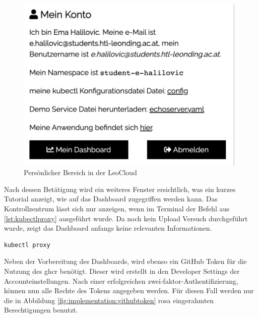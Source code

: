 \begin{figure}
    \centering
    \includegraphics[scale=0.5]{pics/leowikimeinkonto.png}
    \caption{Persönlicher Bereich in der LeoCloud}
    \label{fig:implementation:meinkonto}
\end{figure}

Nach dessen Betätigung wird ein weiteres Fenster ersichtlich, was ein kurzes Tutorial anzeigt, wie auf das Dashboard zugegriffen werden kann. 
Das Kontrollzentrum lässt sich nur anzeigen, wenn im Terminal der Befehl aus \ref{lst:kubectlproxy} ausgeführt wurde. 
Da noch kein Upload Versuch durchgeführt wurde, zeigt das Dashboard anfangs keine relevanten Informationen.

\begin{lstlisting}[label=lst:kubectlproxy, language=bash, caption=Ausführung des Proxys für Kubernetes]
kubectl proxy
\end{lstlisting}    

Neben der Vorbereitung des Dashboards, wird ebenso ein GitHub Token für die Nutzung des \gls{ghcr} benötigt.
Dieser wird erstellt in den Developer Settings der Accounteinstellungen. 
Nach einer erfolgreichen zwei-faktor-Authentifizierung, können nun alle Rechte des Tokens angegeben werden. 
Für diesen Fall werden nur die in Abbildung \ref{fig:implementation:githubtoken} rosa eingerahmten Berechtigungen benutzt.

